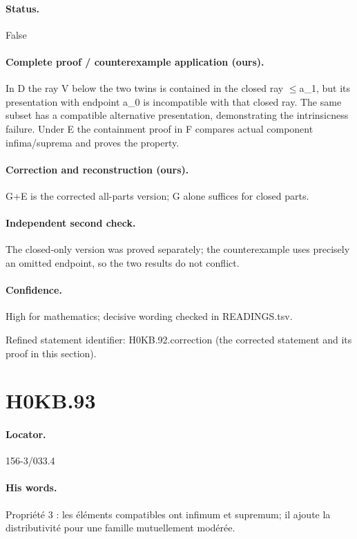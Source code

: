 \paragraph{Status.} False

\paragraph{Complete proof / counterexample application (ours).} In D the ray V below the two twins is contained in the closed ray \ensuremath{\leq}a\_1, but its presentation with endpoint a\_0 is incompatible with that closed ray. The same subset has a compatible alternative presentation, demonstrating the intrinsicness failure. Under E the containment proof in F compares actual component infima/suprema and proves the property.

\paragraph{Correction and reconstruction (ours).} G+E is the corrected all-parts version; G alone suffices for closed parts.

\paragraph{Independent second check.} The closed-only version was proved separately; the counterexample uses precisely an omitted endpoint, so the two results do not conflict.

\paragraph{Confidence.} High for mathematics; decisive wording checked in READINGS.tsv.

\noindent Refined statement identifier: H0KB.92.correction (the corrected statement and its proof in this section).

\section*{H0KB.93}\label{statement:H0KB.93}
\paragraph{Locator.} 156-3/033.4

\paragraph{His words.} Propriété 3 : les éléments compatibles ont infimum et supremum; il ajoute la distributivité pour une famille mutuellement modérée.

